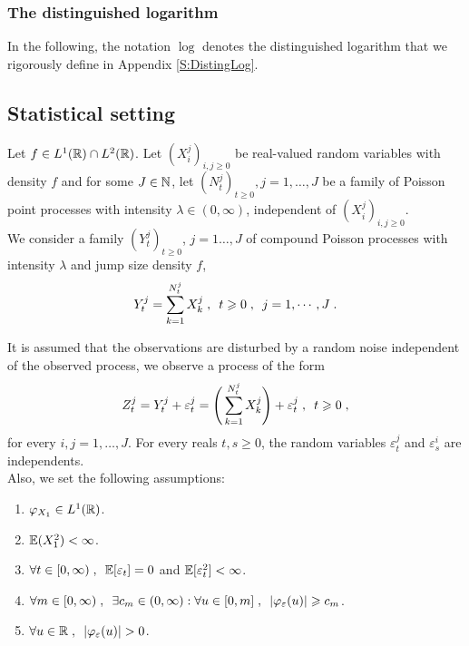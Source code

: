 \subsubsection*{The distinguished logarithm} In the following, the notation $\log$ denotes the distinguished logarithm that we rigorously define in Appendix \ref{S:DistingLog}. 


\subsection{Statistical setting}
\label{s:setting}
Let $f \in L^1(\mathbb{R}) \cap L^2(\mathbb{R})$. Let $(X_i^j)_{i, j \geq 0}$ be \iid real-valued random variables with density $f$ and for some $J \in \mathbb{N}$, let $(N_t^j)_{t\geq0}, j = 1,\ldots,J $ be a family of \iid Poisson point processes with intensity $\lambda \in (0, \infty)$, independent of $(X_i^j)_{i, j \geq 0}$. \\


We consider a family $(Y_t^j)_{t\geq0}$, $j = 1\ldots,J$  of compound Poisson processes with intensity $\lambda$ and jump size density $f$,
	\begin{equation*}
		Y_t^j = \sum_{k = 1}^{N_t^j} X_k^j
		\; , \enspace
		t \geqslant 0
		\; , \enspace
		j = 1,\cdots,J
		\; .
	\end{equation*}

It is assumed that the observations are disturbed by a random noise independent of the observed process, \ie we observe a process of the form
    \begin{equation*}
        Z^j_t = Y^j_t + \varepsilon^j_t
        = \Bigg( \sum^{N_t^j}_{k = 1}X_k^j \Bigg) + \varepsilon^j_t
        \; , \enspace
        t \geqslant 0
        \; ,
    \end{equation*}
for every $i,j = 1, \ldots, J $. For every reals $t,s \geq 0$, the random variables $\varepsilon^j_t$ and $\varepsilon^i_s$ are independents. \\

Also, we set the following assumptions:

\begin{hypothesis*}\text{}
    \begin{enumerate}[label=(\subscript{H}{{\arabic*}})]
        \item $\varphi_{X_1} \in L^1(\mathbb{R})$.
        \label{hyp:target_fctcar_is_invertible}
        \item $\mathbb{E}(X_1^2) < \infty$.  \label{hyp:target_is_square_integrable}
        \item $\forall t \in [0, \infty) \; , \enspace \mathbb{E}[\varepsilon_t] = 0$ 
        \label{hyp:noise_is_centered_and_square_integrable}
        and $\mathbb{E}[\varepsilon_t^2] <\infty$.
        \item  $\forall m \in [0, \infty) \; , \enspace \exists c_m \in (0, \infty) : \forall u \in [0, m]
        \; , \enspace |\varphi_{\varepsilon}(u)| \geqslant c_m$. \label{hyp_noise_is_bounded}
        \item  $\forall u \in \mathbb{R}
        \; , \enspace |\varphi_{\varepsilon}(u)| > 0$. \label{hyp_noise_no_vanish}
    \end{enumerate}
\end{hypothesis*}

